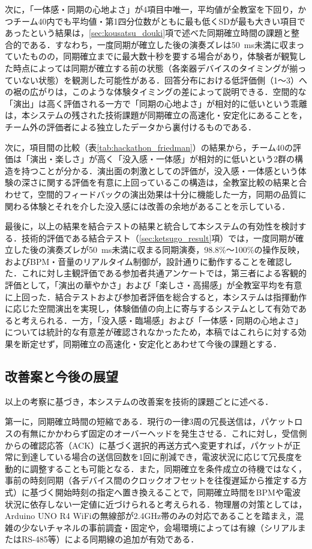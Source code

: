 次に，「一体感・同期の心地よさ」が4項目中唯一，平均値が全教室を下回り，かつチーム40内でも平均値・第1四分位数がともに最も低くSDが最も大きい項目であったという結果は，\ref{sec:kousatsu_douki}項で述べた同期確立時間の課題と整合的である．すなわち，一度同期が確立した後の演奏ズレは\SI{50}{ms}未満に収まっていたものの，同期確立までに最大数十秒を要する場合があり，体験者が観覧した時点によっては同期が確立する前の状態（各楽器デバイスのタイミングが揃っていない状態）を観測した可能性がある．回答分布における低評価側（1〜3）への裾の広がりは，このような体験タイミングの差によって説明できる．空間的な「演出」は高く評価される一方で「同期の心地よさ」が相対的に低いという乖離は，本システムの残された技術課題が同期確立の高速化・安定化にあることを，チーム外の評価者による独立したデータから裏付けるものである．

次に，項目間の比較（表\ref{tab:hackathon_friedman}）の結果から，チーム40の評価は「演出・楽しさ」が高く「没入感・一体感」が相対的に低いという2群の構造を持つことが分かる．演出面の刺激としての評価が，没入感・一体感という体験の深さに関する評価を有意に上回っているこの構造は，全教室比較の結果と合わせて，空間的フィードバックの演出効果は十分に機能した一方，同期の品質に関わる体験とそれを介した没入感には改善の余地があることを示している．

最後に，以上の結果を結合テストの結果と統合して本システムの有効性を検討する．技術的評価である結合テスト（\ref{sec:ketsugo_result}項）では，一度同期が確立した後の演奏ズレが\SI{50}{ms}未満に収まる同期演奏，98.8\%〜100\%の操作反映，およびBPM・音量のリアルタイム制御が，設計通りに動作することを確認した．これに対し主観評価である参加者共通アンケートでは，第三者による客観的評価として，「演出の華やかさ」および「楽しさ・高揚感」が全教室平均を有意に上回った．結合テストおよび参加者評価を総合すると，本システムは指揮動作に応じた空間演出を実現し，体験価値の向上に寄与するシステムとして有効であると考えられる．一方，「没入感・臨場感」および「一体感・同期の心地よさ」については統計的な有意差が確認されなかったため，本稿ではこれらに対する効果を断定せず，同期確立の高速化・安定化とあわせて今後の課題とする．

\subsection{改善案と今後の展望}
\label{sec:kousatsu_tenbou}

以上の考察に基づき，本システムの改善案を技術的課題ごとに述べる．

第一に，同期確立時間の短縮である．現行の一律3周の冗長送信は，パケットロスの有無にかかわらず固定のオーバーヘッドを発生させる．これに対し，受信側からの確認応答（ACK）に基づく選択的再送方式へ変更すれば，パケットが正常に到達している場合の送信回数を1回に削減でき，電波状況に応じて冗長度を動的に調整することも可能となる．また，同期確立を条件成立の待機ではなく，事前の時刻同期（各デバイス間のクロックオフセットを往復遅延から推定する方式）に基づく開始時刻の指定へ置き換えることで，同期確立時間をBPMや電波状況に依存しない一定値に近づけられると考えられる．物理層の対策としては，Arduino UNO R4 WiFiの無線部が2.4GHz帯のみの対応であることを踏まえ，混雑の少ないチャネルの事前調査・固定や，会場環境によっては有線（シリアルまたはRS-485等）による同期線の追加が有効である．

